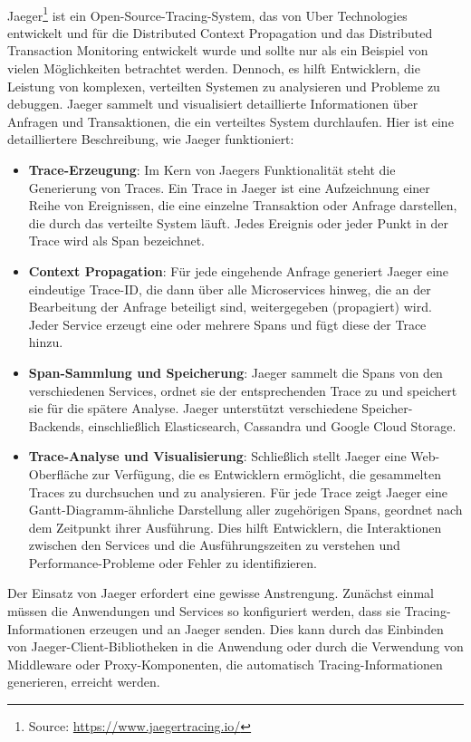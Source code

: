 \\
Jaeger\footnote{Source: \url{https://www.jaegertracing.io/}} ist ein Open-Source-Tracing-System, das von Uber Technologies entwickelt und für die Distributed Context Propagation und das Distributed Transaction Monitoring entwickelt wurde und sollte nur als ein Beispiel von vielen Möglichkeiten betrachtet werden. Dennoch, es hilft Entwicklern, die Leistung von komplexen, verteilten Systemen zu analysieren und Probleme zu debuggen. Jaeger sammelt und visualisiert detaillierte Informationen über Anfragen und Transaktionen, die ein verteiltes System durchlaufen. Hier ist eine detailliertere Beschreibung, wie Jaeger funktioniert:
\begin{itemize}
\item \textbf{Trace-Erzeugung}: Im Kern von Jaegers Funktionalität steht die Generierung von Traces. Ein Trace in Jaeger ist eine Aufzeichnung einer Reihe von Ereignissen, die eine einzelne Transaktion oder Anfrage darstellen, die durch das verteilte System läuft. Jedes Ereignis oder jeder Punkt in der Trace wird als Span bezeichnet.

\item \textbf{Context Propagation}: Für jede eingehende Anfrage generiert Jaeger eine eindeutige Trace-ID, die dann über alle Microservices hinweg, die an der Bearbeitung der Anfrage beteiligt sind, weitergegeben (propagiert) wird. Jeder Service erzeugt eine oder mehrere Spans und fügt diese der Trace hinzu.

\item \textbf{Span-Sammlung und Speicherung}: Jaeger sammelt die Spans von den verschiedenen Services, ordnet sie der entsprechenden Trace zu und speichert sie für die spätere Analyse. Jaeger unterstützt verschiedene Speicher-Backends, einschließlich Elasticsearch, Cassandra und Google Cloud Storage.

\item \textbf{Trace-Analyse und Visualisierung}: Schließlich stellt Jaeger eine Web-Oberfläche zur Verfügung, die es Entwicklern ermöglicht, die gesammelten Traces zu durchsuchen und zu analysieren. Für jede Trace zeigt Jaeger eine Gantt-Diagramm-ähnliche Darstellung aller zugehörigen Spans, geordnet nach dem Zeitpunkt ihrer Ausführung. Dies hilft Entwicklern, die Interaktionen zwischen den Services und die Ausführungszeiten zu verstehen und Performance-Probleme oder Fehler zu identifizieren.
\end{itemize}
Der Einsatz von Jaeger erfordert eine gewisse Anstrengung. Zunächst einmal müssen die Anwendungen und Services so konfiguriert werden, dass sie Tracing-Informationen erzeugen und an Jaeger senden. Dies kann durch das Einbinden von Jaeger-Client-Bibliotheken in die Anwendung oder durch die Verwendung von Middleware oder Proxy-Komponenten, die automatisch Tracing-Informationen generieren, erreicht werden.
